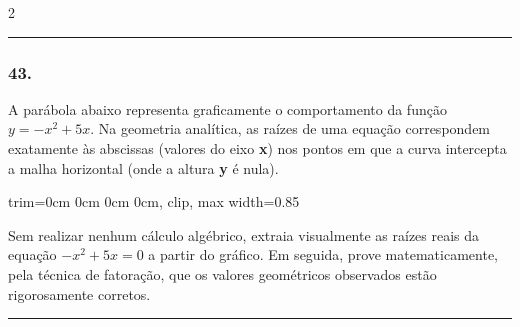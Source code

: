 \documentclass[twoside, 10pt, a4paper]{article}
\newlength{\espacoPreQuestao}\setlength{\espacoPreQuestao}{0.1cm}
\newlength{\espacoQuestao}\setlength{\espacoQuestao}{0.2cm}
\newcommand{\larguraTikz}{0.85\linewidth}
\begin{document}
\begin{multicols*}{2}
\noindent\textcolor{CorLinha}{\rule{\linewidth}{0.5pt}} 
\par\vspace{\espacoPreQuestao}
\subsubsection*{43.} A parábola abaixo representa graficamente o comportamento da função $ y = -x^2 + 5x $. Na geometria analítica, as raízes de uma equação correspondem exatamente às abscissas (valores do eixo \textbf{x}) nos pontos em que a curva intercepta a malha horizontal (onde a altura \textbf{y} é nula).

\begin{center}
\begin{adjustbox}{trim=0cm 0cm 0cm 0cm, clip, max width=\larguraTikz}
\end{adjustbox}
\end{center}

Sem realizar nenhum cálculo algébrico, extraia visualmente as raízes reais da equação $ -x^2 + 5x = 0 $ a partir do gráfico. Em seguida, prove matematicamente, pela técnica de fatoração, que os valores geométricos observados estão rigorosamente corretos.
\par\vspace{\espacoQuestao}

\noindent\textcolor{CorLinha}{\rule{\linewidth}{0.5pt}} 
\par\vspace{\espacoPreQuestao}

\end{multicols*}
\end{document}
